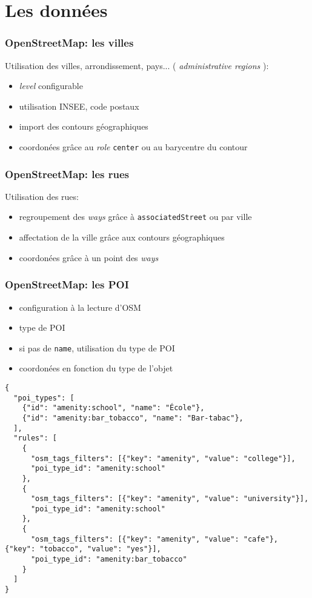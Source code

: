 \documentclass[table]{beamer}
\newcommand*{\foreign}[2][english]{%
    \emph{\foreignlanguage{#1}{#2}}%
}
\begin{document}
\section{Les données}

\begin{frame}
  \frametitle{OpenStreetMap: les villes}

  Utilisation des villes, arrondissement, pays... (\foreign{administrative regions}):
  \begin{itemize}
  \item \foreign{level} configurable
  \item utilisation INSEE, code postaux
  \item import des contours géographiques
  \item coordonées grâce au \foreign{role} \texttt{center} ou au
    barycentre du contour
  \end{itemize}
\end{frame}

\begin{frame}
  \frametitle{OpenStreetMap: les rues}

  Utilisation des rues:
  \begin{itemize}
  \item regroupement des \foreign{ways} grâce à
    \texttt{associatedStreet} ou par ville
  \item affectation de la ville grâce aux contours géographiques
  \item coordonées grâce à un point des \foreign{ways}
  \end{itemize}
\end{frame}

\begin{frame}[fragile]
  \frametitle{OpenStreetMap: les POI}

  \begin{itemize}
  \item configuration à la lecture d'OSM
  \item type de POI
  \item si pas de \texttt{name}, utilisation du type de POI
  \item coordonées en fonction du type de l'objet
  \end{itemize}

  \tiny
\begin{verbatim}
{
  "poi_types": [
    {"id": "amenity:school", "name": "École"},
    {"id": "amenity:bar_tobacco", "name": "Bar-tabac"},
  ],
  "rules": [
    {
      "osm_tags_filters": [{"key": "amenity", "value": "college"}],
      "poi_type_id": "amenity:school"
    },
    {
      "osm_tags_filters": [{"key": "amenity", "value": "university"}],
      "poi_type_id": "amenity:school"
    },
    {
      "osm_tags_filters": [{"key": "amenity", "value": "cafe"}, {"key": "tobacco", "value": "yes"}],
      "poi_type_id": "amenity:bar_tobacco"
    }
  ]
}
\end{verbatim}
\end{frame}
\end{document}

